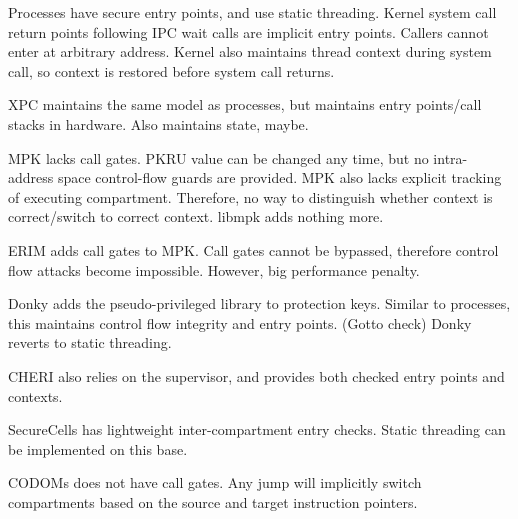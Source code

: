 Processes have secure entry points, and use static threading.
Kernel system call return points following IPC wait calls are implicit
entry points. 
Callers cannot enter at arbitrary address.
Kernel also maintains thread context during system call, so context is
restored before system call returns.

XPC maintains the same model as processes, but maintains entry points/call
stacks in hardware.
Also maintains state, maybe.

MPK lacks call gates. 
PKRU value can be changed any time, but no intra-address space control-flow
guards are provided.
MPK also lacks explicit tracking of executing compartment.
Therefore, no way to distinguish whether context is correct/switch to correct
context.
libmpk adds nothing more.

ERIM adds call gates to MPK.
Call gates cannot be bypassed, therefore control flow attacks become impossible.
However, big performance penalty.

Donky adds the pseudo-privileged library to protection keys.
Similar to processes, this maintains control flow integrity and entry points.
(Gotto check) Donky reverts to static threading.

CHERI also relies on the supervisor, and provides both checked entry points
and contexts.

SecureCells has lightweight inter-compartment entry checks.
Static threading can be implemented on this base.

CODOMs does not have call gates. 
Any jump will implicitly switch compartments based on the source and target
instruction pointers.
